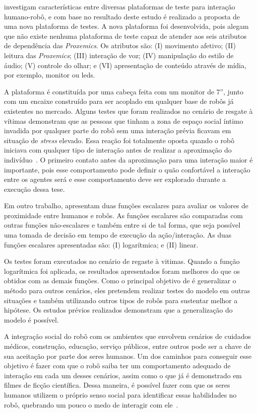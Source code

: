  investigam características entre diversas plataformas de teste para interação humano-robô, e com base no resultado deste estudo é realizado a proposta de uma nova plataforma de testes. A nova plataforma foi desenvolvida, pois  alegam que não existe nenhuma plataforma de teste capaz de atender aos seis atributos de dependência das \emph{Proxemics}. Os atributos são: (I) movimento afetivo; (II) leitura das \emph{Proxemics}; (III) interação de voz; (IV) manipulação do estilo de áudio; (V) controle do olhar; e (VI) apresentação de conteúdo através de mídia, por exemplo, monitor ou leds.

A plataforma é constituída por uma cabeça feita com um monitor de 7'', junto com um encaixe construído para ser acoplado em qualquer base de robôs já existentes no mercado. Alguns testes que foram realizados no cenário de resgate à vítimas demonstram que as pessoas que tinham a zona de espaço social íntimo invadida por qualquer parte do robô sem uma interação prévia ficavam em situação de \emph{stress} elevado. Essa reação foi totalmente oposta quando o robô iniciava com qualquer tipo de interação antes de realizar a aproximação do indivíduo~\cite{Henkel:2012}. O primeiro contato antes da aproximação para uma interação maior é importante, pois esse comportamento pode definir o quão confortável a interação entre os agentes será e esse comportamento deve ser explorado durante a execução dessa tese.

Em outro trabalho,  apresentam duas funções escalares para avaliar os valores de proximidade entre humanos e robôs. As funções escalares são comparadas com outras funções não-escalares e também entre si de tal forma, que seja possível uma tomada de decisão em tempo de execução da ação/interação. As duas funções escalares apresentadas são: (I) logarítmica; e (II) linear.

Os testes foram executados no cenário de regaste à vitimas. Quando a função logarítmica foi aplicada, os resultados apresentados foram melhores do que os obtidos com as demais funções. Como o principal objetivo de  é generalizar o método para outros cenários, eles pretendem realizar testes do modelo em outras situações e também utilizando outros tipos de robôs para sustentar melhor a hipótese. Os estudos prévios realizados demonstram que a generalização do modelo é possível.

A integração social do robô com os ambientes que envolvem cenários de cuidados médicos, construção, educação, serviço públicos, entre outros pode ser a chave de sua aceitação por parte dos seres humanos. Um dos caminhos para conseguir esse objetivo é fazer com que o robô saiba ter um comportamento adequado de interação em cada um desses cenários, assim como o que já é demonstrado em filmes de ficção científica. Dessa maneira, é possível fazer com que os seres humanos utilizem o próprio senso social para identificar essas habilidades no robô, quebrando um pouco o medo de interagir com ele~\cite{Heenan:2014}.

